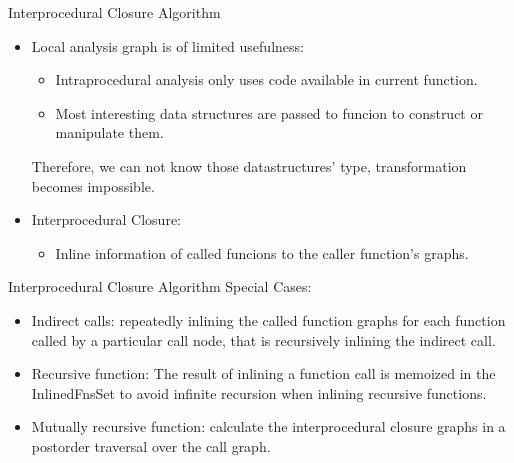 \documentclass{beamer}
\begin{document}
\begin{frame}{Interprocedural Closure Algorithm}
  \begin{itemize}
	  \setlength{\itemsep}{0.5cm}
	  \item Local analysis graph is of limited usefulness:
		\begin{itemize}
		  \item Intraprocedural analysis only uses code available in current function.
			\item Most interesting data structures are passed to funcion to construct or manipulate them.
		\end{itemize}
		Therefore, we can not know those datastructures' type, transformation becomes impossible.
		\item Interprocedural Closure:
		  \begin{itemize}
			\item Inline information of called funcions to the caller function's graphs.
		  \end{itemize}
  \end{itemize}
\end{frame}

\begin{frame}{Interprocedural Closure Algorithm}
  Special Cases:
  \begin{itemize}
	  \setlength{\itemsep}{0.5cm}
	\item Indirect calls: repeatedly inlining the
called function graphs for each function called by a particular call
node, that is recursively inlining the indirect call.
\item Recursive function: The result of inlining
a function call is memoized in the InlinedFnsSet to avoid infinite
recursion when inlining recursive functions.
\item Mutually recursive function: calculate the interprocedural closure graphs
  in a postorder traversal over the call graph.
  \end{itemize}
\end{frame}
\end{document}
